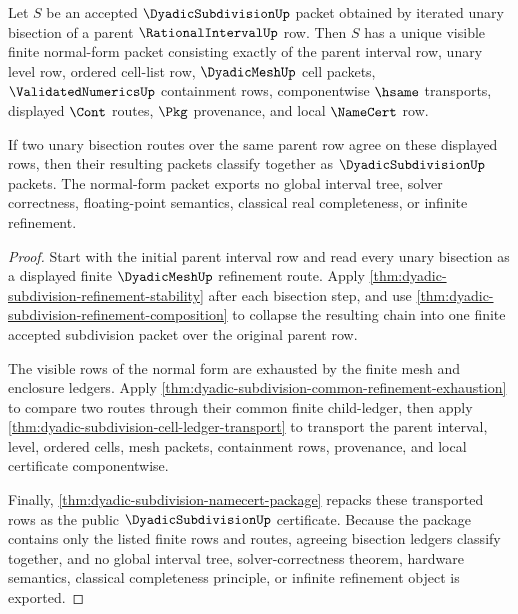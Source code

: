 \begin{theorem}
\label{thm:dyadic-subdivision-routed-bisection-normal-form}
Let $S$ be an accepted $\DyadicSubdivisionUp$ packet obtained by iterated unary bisection of a parent $\RationalIntervalUp$ row. Then $S$ has a unique visible finite normal-form packet consisting exactly of the parent interval row, unary level row, ordered cell-list row, $\DyadicMeshUp$ cell packets, $\ValidatedNumericsUp$ containment rows, componentwise $\hsame$ transports, displayed $\Cont$ routes, $\Pkg$ provenance, and local $\NameCert$ row.

If two unary bisection routes over the same parent row agree on these displayed rows, then their resulting packets classify together as $\DyadicSubdivisionUp$ packets. The normal-form packet exports no global interval tree, solver correctness, floating-point semantics, classical real completeness, or infinite refinement.
\end{theorem}
\begin{proof}
Start with the initial parent interval row and read every unary bisection as a displayed finite $\DyadicMeshUp$ refinement route. Apply \autoref{thm:dyadic-subdivision-refinement-stability} after each bisection step, and use \autoref{thm:dyadic-subdivision-refinement-composition} to collapse the resulting chain into one finite accepted subdivision packet over the original parent row.

The visible rows of the normal form are exhausted by the finite mesh and enclosure ledgers. Apply \autoref{thm:dyadic-subdivision-common-refinement-exhaustion} to compare two routes through their common finite child-ledger, then apply \autoref{thm:dyadic-subdivision-cell-ledger-transport} to transport the parent interval, level, ordered cells, mesh packets, containment rows, provenance, and local certificate componentwise.

Finally, \autoref{thm:dyadic-subdivision-namecert-package} repacks these transported rows as the public $\DyadicSubdivisionUp$ certificate. Because the package contains only the listed finite rows and routes, agreeing bisection ledgers classify together, and no global interval tree, solver-correctness theorem, hardware semantics, classical completeness principle, or infinite refinement object is exported.
\end{proof}

